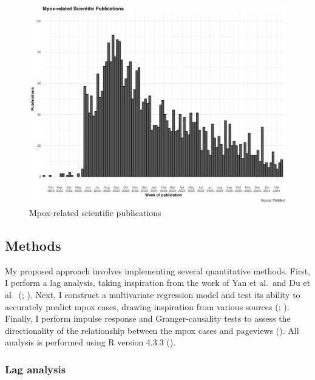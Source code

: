 \documentclass[
  12pt,
]{article}
\begin{document}
\begin{figure}[H]

{\centering \includegraphics{images/mpox-studies.png}

}

\caption{Mpox-related scientific publications}

\end{figure}%

\subsection{Methods}\label{methods-1}

My proposed approach involves implementing several quantitative methods.
First, I perform a lag analysis, taking inspiration from the work of Yan
et al.~and Du et al~ (;
). Next, I construct a multivariate
regression model and test its ability to accurately predict mpox cases,
drawing inspiration from various sources (; ).
Finally, I perform impulse response and Granger-causality tests to
assess the directionality of the relationship between the mpox cases and
pageviews (). All analysis is
performed using R version 4.3.3 ().

\subsubsection{Lag analysis}\label{lag-analysis}
\end{document}
